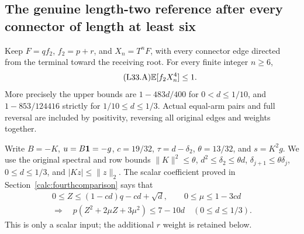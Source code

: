 \subsection{The genuine length-two reference after every connector of length at least six}\label{proof:Q5-C033}
Keep $F=qf_2$, $f_2=p+r$, and $X_n=T^nF$, with every connector
edge directed from the terminal toward the receiving root. For every
finite integer $n\ge6$,
\begin{equation}\tag{L33.A}\label{eq:L33:claim}
\mathbb E[f_2X_n^4]\le1.
\end{equation}
More precisely the upper bounds are $1-483d/400$ for
$0<d\le1/10$, and $1-853/124416$ strictly for
$1/10\le d\le1/3$. Actual equal-arm pairs and full reversal are
included by positivity, reversing all original edges and weights together.


Write $B=-K$, $u=B\mathbf1=-g$, $c=19/32$, $\tau=d-\delta_2$,
$\theta=13/32$, and $s=K^2g$. We use the original spectral and row bounds
$\|K\|^2\le\theta$, $d^2\le\delta_2\le\theta d$,
$\delta_{j+1}\le\theta\delta_j$, $0\le d\le1/3$, and
$|Kz|\le\|z\|_2$. The scalar coefficient proved in
Section~\ref{calc:fourthcomparison} says that
\begin{equation}\tag{L33.1.2}\label{eq:L33:pcoefficient}
\begin{gathered}
0\le Z\le(1-cd)q-cd+\sqrt d,\qquad
0\le\mu\le1-3cd\\
\Longrightarrow\quad p(Z^2+2\mu Z+3\mu^2)\le7-10d
\quad(0\le d\le1/3).
\end{gathered}
\end{equation}
This is only a scalar input; the additional $r$ weight is retained below.

